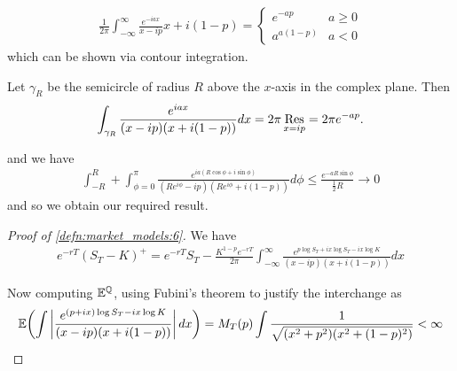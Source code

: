 \begin{lem}
  \begin{align}
    \label{eq:118}
    \frac{1}{2\pi} \int_{-\infty}^{\infty} \frac{e^{-iax}}{x-ip}{x +
      i(1-p)} =
    \begin{cases}
      e^{-ap} & a \geq 0 \\
      a^{a(1-p)} & a < 0
    \end{cases}
  \end{align}
  which can be shown via contour integration.

  Let $\gamma_{R}$ be the semicircle of radius $R$ above the $x$-axis
  in the complex plane. Then
  \begin{align}
    \label{eq:119}
    \int_{\gamma_{R}} \frac{e^{iax}}{(x-ip)(x+i(1-p))} dx = 2\pi
    \operatorname*{Res}_{x=ip} = 2\pi e^{-ap}.
  \end{align}

  and we have
  \begin{align}
    \label{eq:120}
    \int_{-R}^{R} + \int_{\phi=0}^{\pi} \frac{e^{ia(R \cos \phi + i
        \sin \phi)}}{(Re^{i \phi} - ip)(Re^{i \phi} + i(1-p))} d\phi
    \leq \frac{e^{-aR\sin \phi}}{\frac{1}{2}R} \rightarrow 0
  \end{align} and so we obtain our required result.
\end{lem}

\begin{proof}[Proof of \ref{defn:market_models:6}]
  We have
  \begin{align}
    \label{eq:121}
    e^{-rT}(S_{T} - K)^{+} = e^{-rT} S_{T} - \frac{K^{1-p}
      e^{-rT}}{2\pi} \int_{-\infty}^{\infty} \frac{e^{p\log S_{T} +
        ix\log S_{T} - ix \log K}}{(x - ip)(x + i(1-p))} dx 
  \end{align}

  Now computing $\mathbb{E}^{\Q}$, using Fubini's theorem to justify
  the interchange as
  \begin{align}
    \label{eq:122}
    \E{\int \left| \frac{e^{(p + ix) \log S_{T} - ix \log K}}{(x - ip)(x +
        i(1-p))}\right| dx}  = M_{T}(p) \int \frac{1}{\sqrt{(x^{2} +
        p^{2})(x^{2} + (1 - p)^{2})}} < \infty
  \end{align}
\end{proof}

